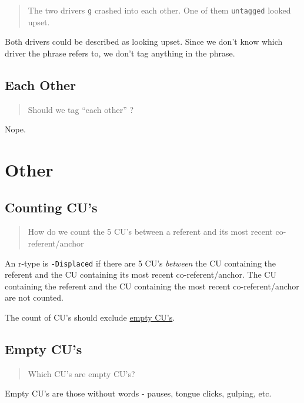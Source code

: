 \documentclass[
]{book}
\begin{document}
\begin{quote}
The two drivers \texttt{g} crashed into each other.
One of them \texttt{untagged} looked upset.
\end{quote}

Both drivers could be described as looking upset.
Since we don't know which driver the phrase refers to, we don't tag anything in the phrase.

\hypertarget{each-other}{%
\subsection{Each Other}\label{each-other}}

\begin{quote}
Should we tag ``each other'' ?
\end{quote}

Nope.

\hypertarget{other}{%
\section{Other}\label{other}}

\hypertarget{counting-cus}{%
\subsection{Counting CU's}\label{counting-cus}}

\begin{quote}
How do we count the 5 CU's between a referent and its most recent co-referent/anchor
\end{quote}

An r-type is \texttt{-Displaced} if there are 5 CU's \emph{between} the CU containing the referent and the CU containing its most recent co-referent/anchor.
The CU containing the referent and the CU containing the most recent co-referent/anchor are not counted.

The count of CU's should exclude \href{empty-cu's}{empty CU's}.

\hypertarget{empty-cus}{%
\subsection{Empty CU's}\label{empty-cus}}

\begin{quote}
Which CU's are empty CU's?
\end{quote}

Empty CU's are those without words - pauses, tongue clicks, gulping, etc.
\end{document}
